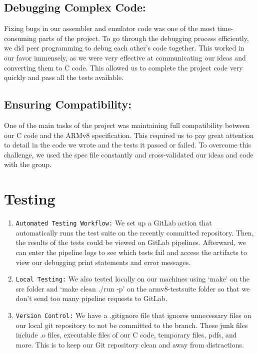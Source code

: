 \documentclass[11pt]{article}
\begin{document}
\subsection{Debugging Complex Code:}
Fixing bugs in our assembler and emulator code was one of the most time-consuming parts of the project. To go through the debugging process efficiently, we did peer programming to debug each other's code together. This worked in our favor immensely, as we were very effective at communicating our ideas and converting them to C code. This allowed us to complete the project code very quickly and pass all the tests available. 

\subsection{Ensuring Compatibility:}
One of the main tasks of the project was maintaining full compatibility between our C code and the ARMv8 specification. This required us to pay great attention to detail in the code we wrote and the tests it passed or failed. To overcome this challenge, we used the spec file constantly and cross-validated our ideas and code with the group.

\section{Testing}
\begin{enumerate}
    \item \verb|Automated Testing Workflow:| We  set up a GitLab action that automatically runs the test suite on the recently committed repository. Then, the results of the tests could be viewed on GitLab pipelines. Afterward, we can enter the pipeline logs to see which tests fail and access the artifacts to view our debugging print statements and error messages.
    
    \item \verb|Local Testing:|  We also tested locally on our machines using ‘make’ on the src folder and ‘make clean ./run -p’ on the armv8-testsuite folder so that we don’t send too many pipeline requests to GitLab.
    
    \item \verb|Version Control:|  We have a .gitignore file that ignores unnecessary files on our local git repository to not be committed to the branch. These junk files include .o files, executable files of our C code, temporary files, pdfs, and more. This is to keep our Git repository clean and away from distractions. 
\end{enumerate}
\end{document}
